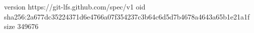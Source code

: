 version https://git-lfs.github.com/spec/v1
oid sha256:2a677dc35224371d6e4766a07f354237c3b64c6d5d7b4678a4643a65b1e21a1f
size 349676
